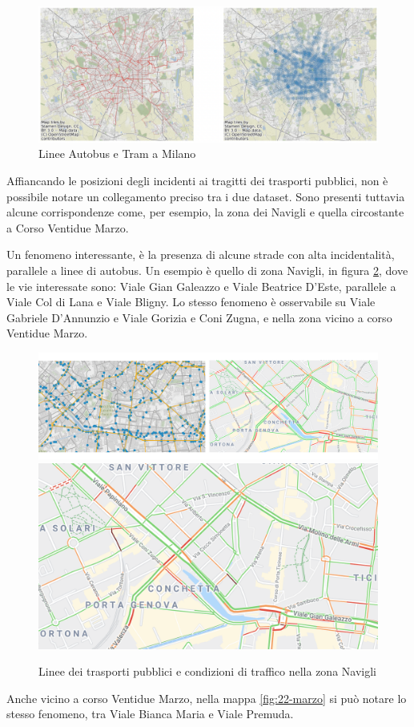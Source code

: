 \documentclass[a4paper,12pt]{report}
\begin{document}
\begin{figure}
    \hfill\includegraphics[width=0.6\linewidth]{../src/atm/linee_atm.png}\hspace*{\fill}
    \caption{Linee Autobus e Tram a Milano}
    \label{fig:geo-trasporti}
\end{figure}

Affiancando le posizioni degli incidenti ai tragitti dei trasporti pubblici, 
non è possibile notare un collegamento preciso tra i due dataset. 
Sono presenti tuttavia alcune corrispondenze come, per esempio, la zona dei Navigli 
e quella circostante a Corso Ventidue Marzo. 

Un fenomeno interessante, è la presenza di alcune strade con alta incidentalità, 
parallele a linee di autobus. 
Un esempio è quello di zona Navigli, in figura \ref{fig:navigli}, dove le vie interessate sono:
Viale Gian Galeazzo e Viale Beatrice D'Este, parallele a Viale Col di Lana e Viale Bligny.
Lo stesso fenomeno è osservabile su Viale Gabriele D'Annunzio e Viale Gorizia e Coni Zugna, 
e nella zona vicino a corso Ventidue Marzo.

\begin{figure}
    \includegraphics[width=0.51\linewidth]{../src/atm/navigli.png}
    \includegraphics[width=0.49\linewidth]{img/navigli.png}
    \caption{Linee dei trasporti pubblici e condizioni di traffico nella zona Navigli}
    \label{fig:navigli}
\end{figure}

Anche vicino a corso Ventidue Marzo, nella mappa \ref{fig:22-marzo} si può 
notare lo stesso fenomeno, tra Viale Bianca Maria e Viale Premuda.
\end{document}
